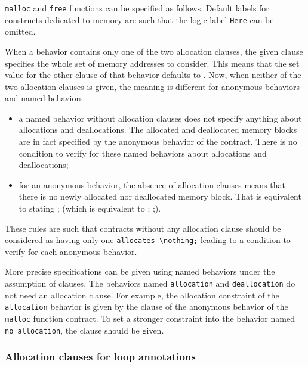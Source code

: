 \begin{example}
  \lstinline|malloc| and \lstinline|free| functions can be specified as follows.
  Default labels for constructs dedicated to memory are
  such that the logic label \lstinline|Here| can be omitted.
\end{example}

When a behavior contains only one of the two allocation clauses,
the given clause specifies the whole set of memory addresses to consider.
This means that the set value for the other clause of that behavior defaults to \nothing.
Now, when neither of the two allocation clauses is given, the meaning is different
for anonymous behaviors and named behaviors:
\begin{itemize}
\item a named behavior without allocation clauses does not specify anything about
      allocations and deallocations.
      The allocated and deallocated memory blocks are in fact specified by the
      anonymous behavior of the contract.
      There is no condition to verify for these named behaviors about allocations
      and deallocations;
\item for an anonymous behavior, the absence of allocation clauses means that there is no newly
      allocated nor deallocated memory block.
      That is equivalent to stating \allocates \nothing; (which is equivalent to  \allocates \nothing; \frees \nothing;).
\end{itemize}
These rules are such that contracts without any allocation clause
should be considered
as having only one \lstinline|allocates \nothing;|
leading to a condition to verify for
each anonymous behavior.

\begin{example}
  More precise specifications can be given using named behaviors under the
  assumption of \assumes clauses.
  The behaviors named \lstinline|allocation| and
  \lstinline|deallocation| do not
  need an allocation clause.
  For example, the allocation constraint of the \lstinline|allocation| behavior
  is given by the clause \allocates \result of the anonymous behavior of the
  \lstinline|malloc| function contract.
  To set a stronger constraint into the behavior named \lstinline|no_allocation|,
  the clause \allocates \nothing should be given.
\end{example}

\subsubsection{Allocation clauses for loop annotations}

